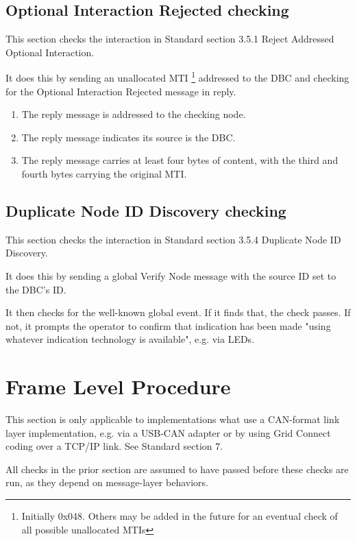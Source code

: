 \documentclass[11pt]{article}
\begin{document}
\subsection{Optional Interaction Rejected checking}

This section checks the interaction in Standard section 3.5.1 Reject Addressed Optional Interaction.

It does this by sending an unallocated MTI
\footnote{Initially 0x048. Others may be added in the future for an eventual
    check of all possible unallocated MTIs}
addressed to the DBC and checking for the Optional Interaction Rejected 
message in reply.

    \begin{enumerate}
    \item The reply message is addressed to the checking node.
    \item The reply message indicates its source is the DBC.
    \item The reply message carries at least four bytes of content, with the 
            third and fourth bytes carrying the original MTI.
    \end{enumerate}

\subsection{Duplicate Node ID Discovery checking}

This section checks the interaction in Standard section 3.5.4 Duplicate Node ID Discovery.

It does this by sending a global Verify Node message with the source ID set to the DBC's ID.

It then checks for the well-known global event.  If it finds that, the check passes.
If not, it prompts the operator to confirm that indication has been made 
"using whatever indication technology is available", e.g. via LEDs.

\section{Frame Level Procedure}

This section is only applicable to implementations what use a CAN-format link layer
implementation, e.g. via a USB-CAN adapter or by using Grid Connect coding
over a TCP/IP link. See Standard section 7.

All checks in the prior section are assumed to have passed before these
checks are run, as they depend on message-layer behaviors.
\end{document}
